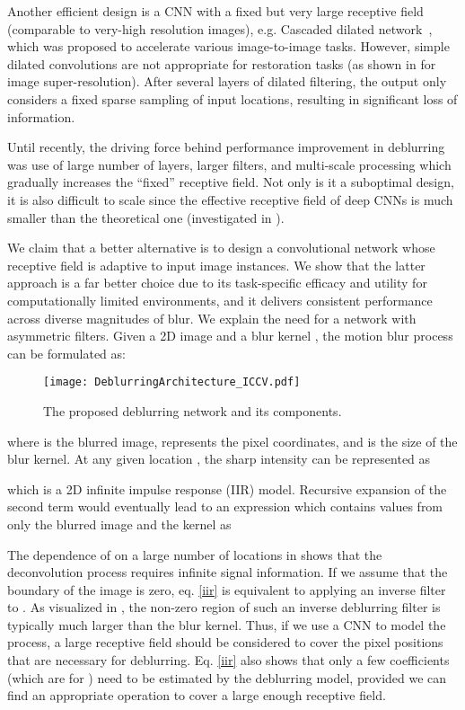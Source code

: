 \documentclass[10pt,twocolumn,letterpaper]{article}
\begin{document}
Another efficient design is a CNN with a fixed but very large receptive field (comparable to very-high resolution images), e.g. Cascaded dilated network~\cite{chen2017fast}, which was proposed to accelerate various image-to-image tasks. However, simple dilated convolutions are not appropriate for restoration tasks (as shown in \cite{liu2018multi} for image super-resolution). After several layers of dilated filtering, the output only considers a fixed sparse sampling of input locations, resulting in significant loss of information. 

Until recently, the driving force behind performance improvement in deblurring was use of large number of layers, larger filters, and multi-scale processing which gradually increases the ``fixed'' receptive field. Not only is it a suboptimal design, it is also difficult to scale since the effective receptive field of deep CNNs is much smaller than the theoretical one (investigated in \cite{luo2016understanding}).

We claim that a better alternative is to design a convolutional network whose receptive field is adaptive to input image instances. We show that the latter approach is a far better choice due to its task-specific efficacy and utility for computationally limited environments, and it delivers consistent performance across diverse magnitudes of blur. We explain the need for a network with asymmetric filters. Given a 2D image  and a blur kernel , the motion blur process can be formulated as:


\begin{figure}[]
\centering
\texttt{[image: DeblurringArchitecture\_ICCV.pdf]}
\caption{The proposed deblurring network and its components.}
\label{fig:architecture}
\end{figure}

 
where  is the blurred image,  represents the pixel coordinates, and  is the size of the blur kernel. At any given location , the sharp intensity can be represented as  
 
which is a 2D infinite impulse response (IIR) model. Recursive expansion of the second term would eventually lead to an expression which contains values from only the blurred image and the kernel as

\begin{small}
     
\end{small}

The dependence of  on a large number of locations in  shows that the deconvolution process requires infinite signal information. If we assume that the boundary of the image is zero, eq. \ref{iir} is equivalent to applying an inverse filter to . As visualized in \cite{zhang2018dynamic}, the non-zero region of such an inverse deblurring filter is typically much larger than the blur kernel. Thus, if we use a CNN to model the process, a large receptive field should be considered to cover the pixel positions that are necessary for deblurring. Eq. \ref{iir} also shows that only a few coefficients (which are  for ) need to be estimated by the deblurring model, provided we can find an appropriate operation to cover a large enough receptive field. 
\end{document}
